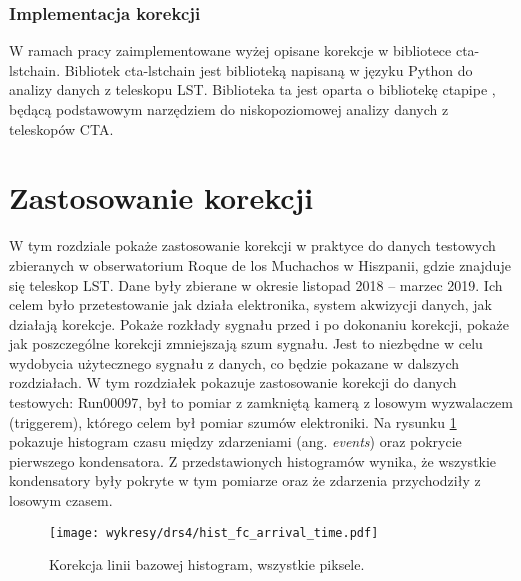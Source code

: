 \documentclass[a4paper,11pt,twoside]{article}
\begin{document}
\subsubsection{Implementacja korekcji}
W ramach pracy zaimplementowane wyżej opisane korekcje w bibliotece cta-lstchain. Bibliotek cta-lstchain \cite{lstchain_url} jest biblioteką napisaną w języku Python do analizy danych z teleskopu LST. Biblioteka ta jest oparta o bibliotekę ctapipe \cite{ctapipe_url}, będącą podstawowym narzędziem do niskopoziomowej analizy danych z teleskopów CTA.


\newpage
\section{Zastosowanie korekcji}
W tym rozdziale pokaże zastosowanie korekcji w praktyce do danych testowych zbieranych w obserwatorium Roque de los Muchachos w Hiszpanii, gdzie znajduje się teleskop LST. Dane były zbierane w okresie listopad 2018 -- marzec 2019. Ich celem było przetestowanie jak działa elektronika, system akwizycji danych, jak działają korekcje. Pokaże rozkłady sygnału przed i po dokonaniu korekcji, pokaże jak poszczególne korekcji zmniejszają szum sygnału. Jest to niezbędne w celu wydobycia użytecznego sygnału z danych, co będzie pokazane w dalszych rozdziałach. W tym rozdziałek pokazuje zastosowanie korekcji do danych testowych: Run00097, był to pomiar z zamkniętą kamerą z losowym wyzwalaczem (triggerem), którego celem był pomiar szumów elektroniki. Na rysunku \ref{fig:data_hist} pokazuje histogram czasu między zdarzeniami (ang. \textsl{events}) oraz pokrycie pierwszego kondensatora. Z przedstawionych histogramów wynika, że wszystkie kondensatory były pokryte w tym pomiarze oraz że zdarzenia przychodziły z losowym czasem.
\begin{figure}[H] 
\centering
\texttt{[image: wykresy/drs4/hist\_fc\_arrival\_time.pdf]}
\caption{Korekcja linii bazowej histogram, wszystkie piksele.}
\label{fig:data_hist}
\end{figure}
\end{document}
